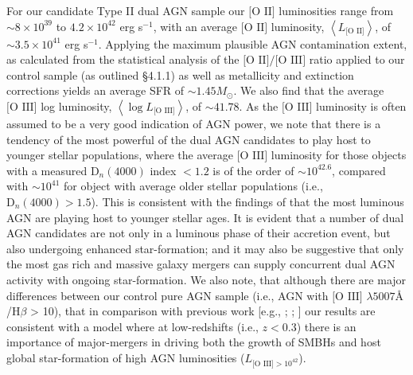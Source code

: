 For our candidate Type II dual AGN sample our $\text{[O II]}$ luminosities range from $\sim{8\times{10}^{39}}$ to $4.2\times{10}^{42}$ erg s$^{-1}$, with an average $\text{[O II]}$ luminosity, $\left\langle{L_{\text{[O II]}}}\right\rangle$, of $\sim{3.5\times{10^{41}}}$ erg s$^{-1}$. Applying the maximum plausible AGN contamination extent, as calculated from the statistical analysis of the $\text{[O II]}/\text{[O III]}$ ratio applied to our control sample (as outlined §4.1.1) as well as metallicity and extinction corrections yields an average SFR of $\sim{1.45}M_{\odot}$. We also find that the average $\text{[O III]}$ log  luminosity, $\left\langle\log{L_{\text{[O III]}}}\right\rangle$, of $\sim{41.78}$. As the $\text{[O III]}$ luminosity is often assumed to be a very good indication of AGN power, we note that there is a tendency of the most powerful of the dual AGN candidates to play host to younger stellar populations, where the average $\text{[O III]}$ luminosity for those objects with a measured $\text{D}_n(4000)$ index $<{1.2}$ is of the order of $\sim{10^{42.6}}$, compared with $\sim{10^{41}}$ for object with average older stellar populations (i.e., $\text{D}_n(4000)>{1.5}$). This is consistent with the findings of \cite{Kauffmann_2003} that the most luminous AGN are playing host to younger stellar ages. It is evident that a number of dual AGN candidates are not only in a luminous phase of their accretion event, but also undergoing enhanced star-formation; and it may also be suggestive that only the most gas rich and massive galaxy mergers can supply concurrent dual AGN activity with ongoing star-formation. We also note, that although there are major differences between our control pure AGN sample (i.e., AGN with $\text{[O III]}$ $\lambda{5007}Å$/$\text{H}\beta$ > 10), that in comparison with previous work [e.g., \cite{Volonteri_2003}; \cite{Gu_2006}; \cite{Somerville_2008} \cite{Rosario_2012}] our results are consistent with a model where at low-redshifts (i.e., $z<{0.3}$) there is an importance of major-mergers in driving both the growth of SMBHs and host global star-formation of high AGN luminosities ($L_{\text{[O III]}>{10^{42}}}$). 

